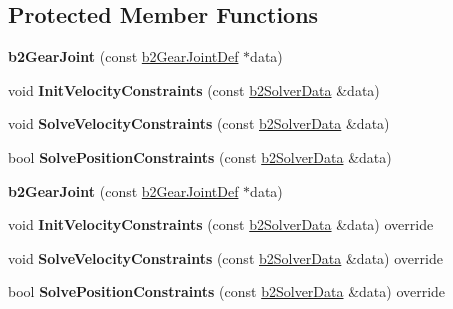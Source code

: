 \subsection*{Protected Member Functions}
\begin{DoxyCompactItemize}
\item 
\mbox{\label{classb2GearJoint_a4b247c79e74cb1e5b906527fe7d151ce}} 
{\bfseries b2\+Gear\+Joint} (const \hyperlink{structb2GearJointDef}{b2\+Gear\+Joint\+Def} $\ast$data)
\item 
\mbox{\label{classb2GearJoint_ad1d8e7b5434ad899c510dd223a72e6cb}} 
void {\bfseries Init\+Velocity\+Constraints} (const \hyperlink{structb2SolverData}{b2\+Solver\+Data} \&data)
\item 
\mbox{\label{classb2GearJoint_a7684e28e93a3dc88a0e84424be937355}} 
void {\bfseries Solve\+Velocity\+Constraints} (const \hyperlink{structb2SolverData}{b2\+Solver\+Data} \&data)
\item 
\mbox{\label{classb2GearJoint_a6be119465783ecb3f055695c7a713de2}} 
bool {\bfseries Solve\+Position\+Constraints} (const \hyperlink{structb2SolverData}{b2\+Solver\+Data} \&data)
\item 
\mbox{\label{classb2GearJoint_a4b247c79e74cb1e5b906527fe7d151ce}} 
{\bfseries b2\+Gear\+Joint} (const \hyperlink{structb2GearJointDef}{b2\+Gear\+Joint\+Def} $\ast$data)
\item 
\mbox{\label{classb2GearJoint_ac3c76db6940bcb4c94d564960b9c57ab}} 
void {\bfseries Init\+Velocity\+Constraints} (const \hyperlink{structb2SolverData}{b2\+Solver\+Data} \&data) override
\item 
\mbox{\label{classb2GearJoint_a25ff465354108f5ae2b60fb9f7836820}} 
void {\bfseries Solve\+Velocity\+Constraints} (const \hyperlink{structb2SolverData}{b2\+Solver\+Data} \&data) override
\item 
\mbox{\label{classb2GearJoint_a85633bbab3c4b4cb862bccce7e0253c2}} 
bool {\bfseries Solve\+Position\+Constraints} (const \hyperlink{structb2SolverData}{b2\+Solver\+Data} \&data) override
\end{DoxyCompactItemize}
